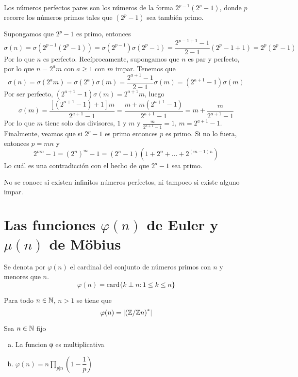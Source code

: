 \documentclass[TAN.tex]{subfiles}
\begin{document}
\begin{teorema}
Los números perfectos pares son los números de la forma $2^{p-1}(2^p-1)$, donde $p$ recorre los números primos tales que $(2^p-1)$ sea también primo.
\end{teorema}
\newpage
\begin{dem}
Supongamos que $2^p -1$ es primo, entonces
$$
\sigma(n) =\sigma (2^{p-1}(2^p-1)) = \sigma(2^{p-1})\sigma(2^p -1) = \frac{2^{p-1+1}-1}{2-1}(2^p-1+1) =2^p(2^p-1)
$$
Por lo que $n$ es perfecto. Recíprocamente, supongamos que $n$ es par y perfecto, por lo que $n=2^am$ con $a\geq 1$ con $m$ impar. Tenemos que
$$
\sigma(n)=\sigma(2^am) = \sigma(2^a)\sigma(m) =\frac{2^{a+1}-1}{2-1}\sigma(m)=(2^{a+1}-1)\sigma(m)
$$
Por ser perfecto, $(2^{a+1}-1)\sigma(m) = 2^{a+1}m$, luego
$$
\sigma(m)=\frac{[(2^{a+1}-1)+1]m}{2^{a+1}-1} = \frac{m + m(2^{a+1}-1)}{2^{a+1}-1} = m + \frac{m}{2^{a+1}-1}
$$
Por lo que $m$ tiene solo dos divisores, $1$ y $m$ y $\frac{m}{2^{a+1}-1}=1$, $m=2^{a+1}-1$. Finalmente, veamos que si $2^p -1$ es primo entonces $p$ es primo. Si no lo fuera, entonces $p=mn$ y 
$$
2^{mn}-1 = (2^n)^m - 1 = (2^n-1)(1+2^n + \dotsc + 2^{(m-1)n})
$$
Lo cuál es una contradicción con el hecho de que $2^a-1$ sea primo.
\QED
\end{dem}
No se conoce si existen infinitos números perfectos, ni tampoco si existe alguno impar.


\section{Las funciones $φ(n)$ de Euler y $μ(n)$ de Möbius}
\begin{defi}
Se denota por $φ(n)$ el cardinal del conjunto de números primos con $n$ y menores que $n$.
\[ φ(n) = \text{card}\{k \perp n : 1 ≤ k ≤ n\} \]
\end{defi}
\begin{prop}
Para todo $n\in \mathbb{N}$, $n>1$ se tiene que 
$$
\varphi(n)=\lvert\left(\mathbb{Z}/\mathbb{Z} n\right)^\ast\rvert
$$
\begin{dem}
Sea $n\in \mathbb{N}$ fijo 
\end{dem}
\end{prop}
\begin{prop}\mbox{}
\begin{enumerate}[(a)]
	\item La funcion φ es multiplicativa
	\item $φ(n) = n \displaystyle\prod_{p|n} \left(1-\dfrac{1}{p}\right)$
\end{enumerate}
\end{prop}
\end{document}
